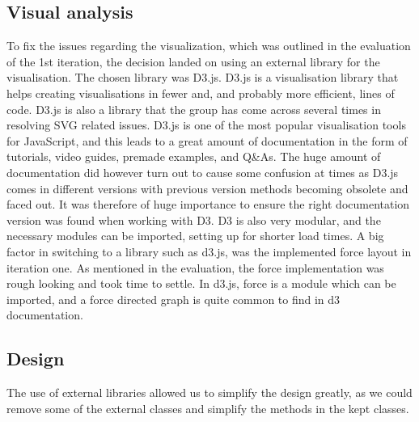 \subsection{Visual analysis}
To fix the issues regarding the visualization, which was outlined in the evaluation of the 1st iteration, the decision landed on using an external library for the visualisation. The chosen library was D3.js. D3.js is a visualisation library that helps creating visualisations in fewer and, and probably more efficient, lines of code\cite{useD3}.  D3.js is also a library that the group has come across several times in resolving SVG related issues. D3.js is one of the most popular visualisation tools for JavaScript, and this leads to a great amount of documentation in the form of tutorials, video guides, premade examples, and Q\&As. The huge amount of documentation did however turn out to cause some confusion at times as D3.js comes in different versions with previous version methods becoming obsolete and faced out. It was therefore of huge importance to ensure the right documentation version was found when working with D3. D3 is also very modular, and the necessary modules can be imported, setting up for shorter load times.
A big factor in switching to a library such as d3.js, was the implemented force layout in iteration one. As mentioned in the evaluation, the force implementation was rough looking and took time to settle. In d3.js, force is a module which can be imported, and a force directed graph is quite common to find in d3 documentation\cite{forcedirectedD3}.

\subsection{Design}
The use of external libraries allowed us to simplify the design greatly, as we could remove some of the external classes and simplify the methods in the kept classes.

